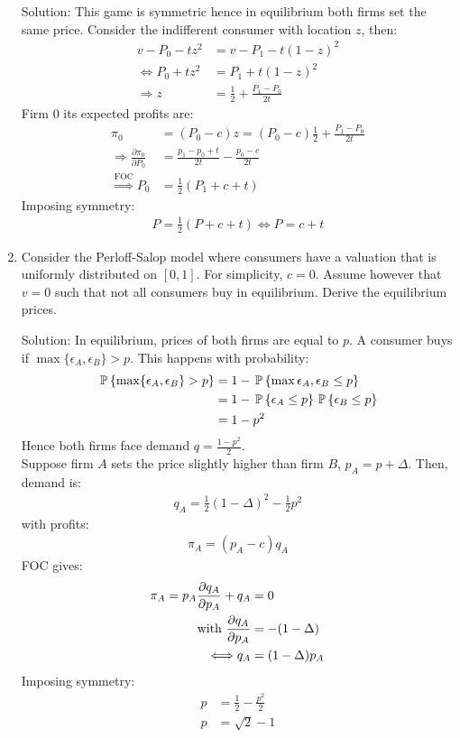 \begin{enumerate}
	Solution: This game is symmetric hence in equilibrium both firms set the same price.
	Consider the indifferent consumer with location $z$, then:
	\begin{align*}
	  v-P_0-tz^2                   & =v-P_1-t(1-z)^2                 \\
	  \Longleftrightarrow P_0+tz^2 & =P_1+t(1-z)^2                   \\
	  \Longrightarrow z            & =\frac{1}{2}+\frac{P_1-P_0}{2t}
	\end{align*}
	Firm 0 its expected profits are:
	\begin{align*}
	  \pi_0                                             & =(P_0-c)z=(P_0-c)\frac{1}{2}+\frac{P_1-P_0}{2t} \\
	  \Longrightarrow\frac{\partial\pi_0}{\partial P_0} & =\frac{p_1-p_0+t}{2t}-\frac{p_0-c}{2t}          \\
	  \overset{\text{FOC}}{\Longrightarrow}P_0          & =\frac{1}{2}(P_1+c+t)
	\end{align*}
	Imposing symmetry:
	\begin{align*}
	  P=\frac{1}{2}(P+c+t)\Longleftrightarrow P=c+t
	\end{align*}
  \item Consider the Perloff-Salop model where consumers have a valuation that is uniformly
	distributed on $[0, 1]$. For simplicity, $c = 0$. Assume however that $v = 0$ such
	that not all consumers buy in equilibrium. Derive the equilibrium prices.

	Solution: In equilibrium, prices of both firms are equal to $p$. A consumer buys if $\max\{\epsilon_A,\epsilon_B\}>p$.
	This happens with probability:
	\begin{align*}
	  \P{\max\{\epsilon_A,\epsilon_B\}>p}&=1-\P{\max{\epsilon_A,\epsilon_B}\leq p}\\
					     &=1-\P{\epsilon_A\leq p}\P{\epsilon_B\leq p}\\
					     &=1-p^2
	\end{align*}
	Hence both firms face demand $q=\frac{1-p^2}{2}$.\\
	Suppose firm $A$ sets the price slightly higher than firm $B$, $p_A=p+\Delta$. Then, demand is:
	\begin{align*}
	  q_A=\frac{1}{2}(1-\Delta)^2-\frac{1}{2}p^2
	\end{align*}
	with profits:
	\begin{align*}
	  \pi_A=(p_A-c)q_A
	\end{align*}
	FOC gives:
	\begin{align*}
	  \pi_A=p_A\pder{q_A}{p_A}+q_A&=0\\
	  \text{with }\pder{q_A}{p_A} &=-(1-\Delta)\\
	  \Longleftrightarrow q_A     &=(1-\Delta)p_A
	\end{align*}
	Imposing symmetry:
	\begin{align*}
	  p&=\frac{1}{2}-\frac{p^2}{2}\\
	  p&=\sqrt{2}-1
	\end{align*}
\end{enumerate}
